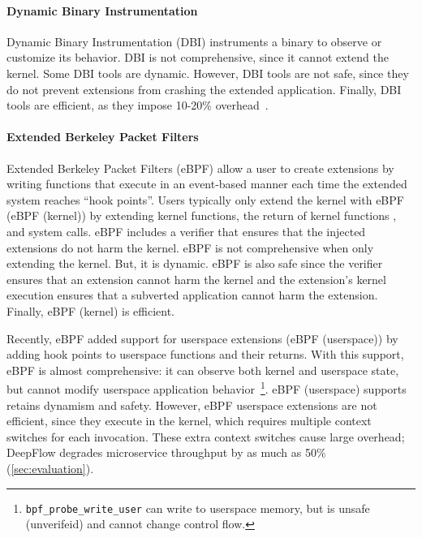 \paragraph{Dynamic Binary Instrumentation} Dynamic Binary Instrumentation (DBI) instruments a binary to observe or customize its behavior.  DBI is not comprehensive, since it cannot extend the kernel.  Some DBI tools are dynamic.  However, DBI tools are not safe, since they do not prevent extensions from crashing the extended application.  Finally, DBI tools are efficient, as they impose 10-20\% overhead~\cite{Bruening12}. 

\paragraph{Extended Berkeley Packet Filters} Extended Berkeley Packet Filters (eBPF) allow a user to create extensions by writing functions that execute in an event-based manner each time the extended system reaches ``hook points''.  Users typically only extend the kernel with eBPF (eBPF (kernel)) by extending kernel functions, the return of kernel functions , and system calls.  eBPF includes a verifier that ensures that the injected extensions do not harm the kernel.  eBPF is not comprehensive when only extending the kernel. But, it is dynamic.  eBPF is also safe since the verifier ensures that an extension cannot harm the kernel and the extension's kernel execution ensures that a subverted application cannot harm the extension.  Finally, eBPF (kernel) is efficient.

Recently, eBPF added support for userspace extensions (eBPF (userspace)) by adding hook points to userspace functions and their returns.  With this support, eBPF is almost comprehensive: it can observe both kernel and userspace state, but cannot modify userspace application behavior~\footnote{\texttt{bpf\_probe\_write\_user} can write to userspace memory, but is unsafe (unverifeid) and cannot change control flow.}.  eBPF (userspace) supports retains dynamism and safety.  However, eBPF userspace extensions are not efficient, since they execute in the kernel, which requires multiple context switches for each invocation.  These extra context switches cause large overhead; \eg DeepFlow degrades microservice throughput by as much as 50\% (\cref{sec:evaluation}).

\smallskip

\noindent{}



